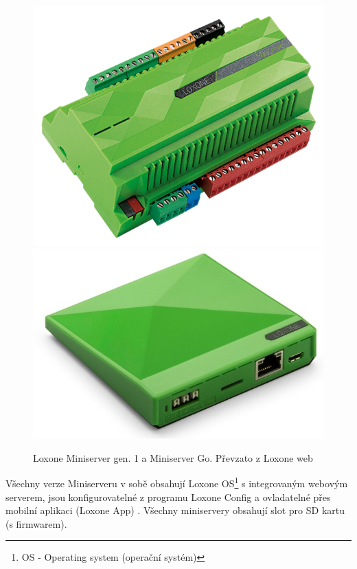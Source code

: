 \begin{figure}[hbt]
	\centering
	\includegraphics{obrazky/loxone-miniserver.png}
	\includegraphics{obrazky/loxone-miniserver-go.jpg}
	\caption{Loxone Miniserver gen. 1 a Miniserver Go. Převzato z Loxone web}
	\label{miniserver}
\end{figure}


Všechny verze Miniserveru v sobě obsahují Loxone OS\footnote{OS - Operating system (operační systém)} s integrovaným webovým serverem, jsou konfigurovatelné z programu Loxone Config a ovladatelné přes mobilní aplikaci (Loxone App) \cite{MiniserverGo}. Všechny miniservery obsahují slot pro SD kartu (s firmwarem). 

